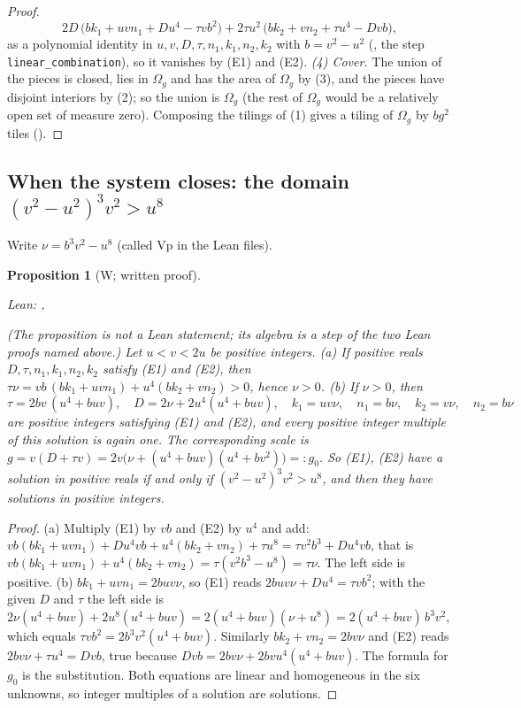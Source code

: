 \documentclass[11pt,reqno]{amsart}
\theoremstyle{plain}
\newtheorem{proposition}[theorem]{Proposition}
\theoremstyle{definition}
\newcommand{\sW}{\textup{\textsf{W}}}
\begin{document}
\begin{proof}
\[
2D\,\bigl(bk_1+uvn_1+Du^4-\tau vb^2\bigr)+2\tau u^2\,\bigl(bk_2+vn_2+\tau u^4-Dvb\bigr),
\]
as a polynomial identity in $u,v,D,\tau,n_1,k_1,n_2,k_2$ with $b=v^2-u^2$ (, the step \texttt{linear\_combination}), so it vanishes by (E1) and (E2).
\emph{(4) Cover.} The union of the pieces is closed, lies in $\Omega_{g}$ and has the area of $\Omega_{g}$ by (3), and the pieces have disjoint interiors by (2); so the union is $\Omega_{g}$ (the rest of $\Omega_{g}$ would be a relatively open set of measure zero). Composing the tilings of (1) gives a tiling of $\Omega_{g}$ by $bg^2$ tiles ().
\end{proof}

\subsection{When the system closes: the domain $(v^2-u^2)^3v^2>u^8$}
Write $\nu=b^3v^2-u^8$ (called $\mathrm{Vp}$ in the Lean files).
\begin{proposition}[\sW; written proof]\label{prop:herdtdomain}
{\small\noindent\emph{Lean:} , \par}
(The proposition is not a Lean statement; its algebra is a step of the two Lean proofs named above.) Let $u<v<2u$ be positive integers. \textup{(a)} If positive reals $D,\tau,n_1,k_1,n_2,k_2$ satisfy \textup{(E1)} and \textup{(E2)}, then $\tau \nu =vb\,(bk_1+uvn_1)+u^4(bk_2+vn_2)>0$, hence $\nu >0$.
\textup{(b)} If $\nu >0$, then
\[
\tau=2bv\,(u^4+buv),\quad D=2\nu +2u^4(u^4+buv),\quad k_1=uv\nu ,\quad n_1=b\nu ,\quad k_2=v\nu ,\quad n_2=b\nu 
\]
are positive integers satisfying \textup{(E1)} and \textup{(E2)}, and every positive integer multiple of this solution is again one. The corresponding scale is $g=v(D+\tau v)=2v\bigl(\nu +(u^4+buv)(u^4+bv^2)\bigr)=:g_0$.
So \textup{(E1)}, \textup{(E2)} have a solution in positive reals if and only if $(v^2-u^2)^3v^2>u^8$, and then they have solutions in positive integers.
\end{proposition}
\begin{proof}
(a) Multiply (E1) by $vb$ and (E2) by $u^4$ and add: $vb(bk_1+uvn_1)+Du^4vb+u^4(bk_2+vn_2)+\tau u^8=\tau v^2b^3+Du^4vb$, that is $vb(bk_1+uvn_1)+u^4(bk_2+vn_2)=\tau(v^2b^3-u^8)=\tau \nu $. The left side is positive.
(b) $bk_1+uvn_1=2buv\nu $, so (E1) reads $2buv\nu +Du^4=\tau vb^2$; with the given $D$ and $\tau$ the left side is $2\nu (u^4+buv)+2u^8(u^4+buv)=2(u^4+buv)(\nu +u^8)=2(u^4+buv)\,b^3v^2$, which equals $\tau vb^2=2b^3v^2(u^4+buv)$. Similarly $bk_2+vn_2=2bv\nu $ and (E2) reads $2bv\nu +\tau u^4=Dvb$, true because $Dvb=2bv\nu +2bvu^4(u^4+buv)$. The formula for $g_0$ is the substitution. Both equations are linear and homogeneous in the six unknowns, so integer multiples of a solution are solutions.
\end{proof}
\end{document}
